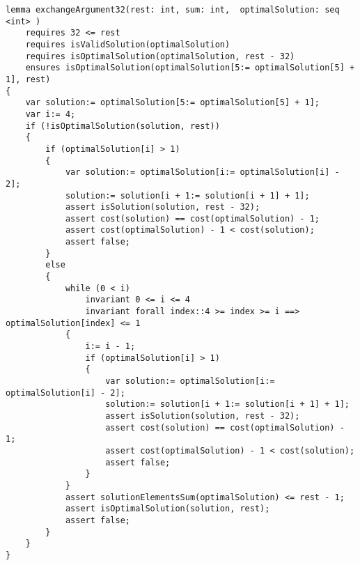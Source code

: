 \begin{lstlisting}    
lemma exchangeArgument32(rest: int, sum: int,  optimalSolution: seq <int> )
    requires 32 <= rest
    requires isValidSolution(optimalSolution)
    requires isOptimalSolution(optimalSolution, rest - 32)
    ensures isOptimalSolution(optimalSolution[5:= optimalSolution[5] + 1], rest) 
{
    var solution:= optimalSolution[5:= optimalSolution[5] + 1];
    var i:= 4;
    if (!isOptimalSolution(solution, rest)) 
    {
        if (optimalSolution[i] > 1) 
        {
            var solution:= optimalSolution[i:= optimalSolution[i] - 2];
            solution:= solution[i + 1:= solution[i + 1] + 1];
            assert isSolution(solution, rest - 32);
            assert cost(solution) == cost(optimalSolution) - 1;
            assert cost(optimalSolution) - 1 < cost(solution);
            assert false;
        } 
        else
        {
            while (0 < i)
                invariant 0 <= i <= 4
                invariant forall index::4 >= index >= i ==> optimalSolution[index] <= 1 
            {
                i:= i - 1;
                if (optimalSolution[i] > 1) 
                {
                    var solution:= optimalSolution[i:= optimalSolution[i] - 2];
                    solution:= solution[i + 1:= solution[i + 1] + 1];
                    assert isSolution(solution, rest - 32);
                    assert cost(solution) == cost(optimalSolution) - 1;
                    assert cost(optimalSolution) - 1 < cost(solution);
                    assert false;
                }
            }
            assert solutionElementsSum(optimalSolution) <= rest - 1;
            assert isOptimalSolution(solution, rest);
            assert false;
        }
    }
}

\end{lstlisting}

